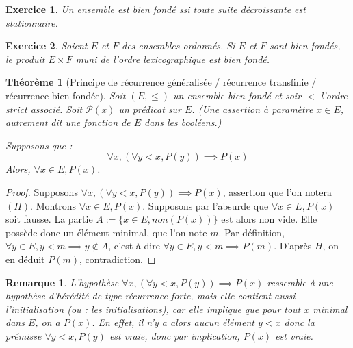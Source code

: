 \documentclass[12pt]{article}
\newtheorem{theoreme}[thm]{Théorème}
\newtheorem*{exo}{Exercice}
\newtheorem{remarque}[thm]{Remarque}
\begin{document}
\begin{exo}
Un ensemble est bien fondé ssi toute suite décroissante est stationnaire.
\end{exo}



\begin{exo} Soient $E$ et $F$ des ensembles ordonnés.
Si $E$ et $F$ sont bien fondés, le produit $E\times F$ muni de l'ordre lexicographique est bien fondé.
\end{exo}



\begin{theoreme}[Principe de récurrence généralisée / récurrence transfinie / récurrence bien fondée]
Soit $(E,\leq)$ un ensemble bien fondé et soir $<$ l'ordre strict associé.
Soit $\mathcal P(x)$ un prédicat sur $E$. (Une assertion à paramètre $x\in E$, autrement dit une fonction de $E$ dans les booléens.)

Supposons que : 
\[ \forall x, (\forall y< x, P(y)) \implies P(x)\]
Alors, $\forall x\in E, P(x)$.
\end{theoreme}



\begin{proof}
Supposons $\forall x, (\forall y< x, P(y)) \implies P(x)$, assertion que l'on notera $(H)$.
Montrons $\forall x\in E, P(x)$.
Supposons par l'absurde que  $\forall x\in E, P(x)$ soit fausse.
La partie $A := \{x\in E, non(P(x))\}$ est alors non vide.
Elle possède donc un élément minimal, que l'on note $m$.
Par définition, $\forall y\in E, y< m \implies y\not\in A$, c'est-à-dire $\forall y\in E, y< m \implies P(m)$.
D'après $H$, on en déduit $P(m)$, contradiction.
\end{proof}

\begin{remarque}
L'hypothèse $\forall x, (\forall y< x, P(y)) \implies P(x)$ ressemble à une hypothèse d'hérédité de type récurrence forte, mais elle contient aussi l'initialisation (ou : les initialisations), car elle implique que pour tout $x$ minimal dans $E$, on a $P(x)$. En effet, il n'y a alors aucun élément $y<x$ donc la prémisse $\forall y< x, P(y)$ est vraie, donc par implication, $P(x)$ est vraie.
\end{remarque}
\end{document}
